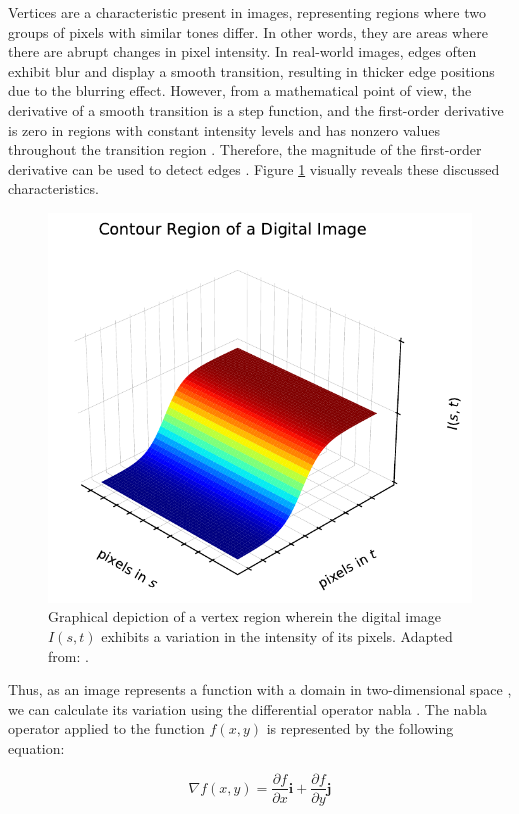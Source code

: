 Vertices are a characteristic present in images, representing regions where two groups of pixels with similar tones differ. In other words, they are areas where there are abrupt changes in pixel intensity. In real-world images, edges often exhibit blur and display a smooth transition, resulting in thicker edge positions due to the blurring effect. However, from a mathematical point of view, the derivative of a smooth transition is a step function, and the first-order derivative is zero in regions with constant intensity levels and has nonzero values throughout the transition region \cite{Chaple2015}. Therefore, the magnitude of the first-order derivative can be used to detect edges \cite{gonzalez_rafael_c_digital_2018}. Figure \ref{fig: imageBoundary} visually reveals these discussed characteristics.

\begin{figure}[ht!]
\centering
\includegraphics[width=.65\linewidth]{images/Development/chap3/chart.pdf}
\caption{Graphical depiction of a vertex region wherein the digital image $I(s, t)$ exhibits a variation in the intensity of its pixels. Adapted from: \cite{marr1980theory}.}
\label{fig: imageBoundary}
\end{figure}


Thus, as an image represents a function with a domain in two-dimensional space \cite{marr1980theory}, we can calculate its variation using the differential operator nabla \cite{Zhang2020}. The nabla operator applied to the function \(f(x, y)\) is represented by the following equation:


\begin{equation}
    \nabla f(x, y) = \frac{\partial f}{\partial x} \mathbf{i} + \frac{\partial f}{\partial y} \mathbf{j}
\end{equation}

